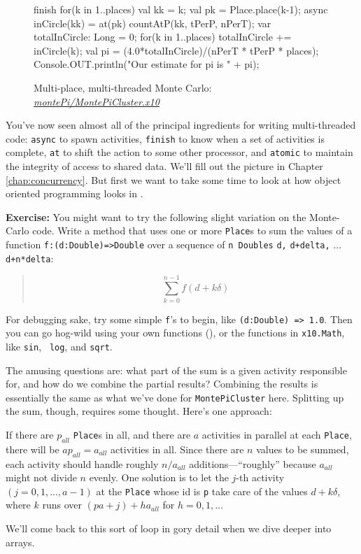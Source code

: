 \begin{figure}[!htbp]
\begin{xtennum}[]
{{      finish for(k in 1..places) {
         val kk = k;
         val pk = Place.place(k-1);
         async inCircle(kk) = at(pk) countAtP(kk, tPerP, nPerT);
      }
      var totalInCircle: Long = 0;
      for(k in 1..places) {
         totalInCircle += inCircle(k);
      }
      val pi = (4.0*totalInCircle)/(nPerT * tPerP * places);
      Console.OUT.println("Our estimate for pi is " + pi);
   }
}
\end{xtennum}
\hrulefill
\caption{Multi-place, multi-threaded Monte Carlo:
\href{http://dist.codehaus.org/x10/documentation/guide/src/montePi/MontePiCluster.x10}{\em
montePi/MontePiCluster.x10}}\label{fig:mpmtmc}
\end{figure}

You've now seen almost all of the principal ingredients for writing multi-threaded
\Xten{} code: {\tt async} to spawn activities, {\tt finish} to know when a
set of activities is complete, {\tt at} to shift the action to some other
processor, and {\tt atomic} to maintain the integrity of access to shared
data.  We'll fill out the picture in Chapter \ref{chap:concurrency}.
But first we want to take some time to look at how object oriented
programming looks in \Xten.

{\bf Exercise:} You might want to try the following slight variation on the Monte-Carlo
code.   Write a method that
uses one or more {\tt Place}s to sum the values of a function  {\tt f:(d:Double)=>Double} over a 
sequence of {\tt n Doubles}  {\tt d,} {\tt d+delta,} ... {\tt d+n*delta}:

\begin{quote}\begin{equation}
\sum_{k=0}^{n-1}  f(d + k\delta)
\end{equation}
\end{quote}

For debugging sake, try some simple {\tt f}'s to begin, like {\tt (d:Double) =>
1.0}.  Then you can go hog-wild using your own functions (), or the functions in {\tt x10.Math}, like {\tt sin}, {\tt
log}, and {\tt sqrt}.

The amusing questions are: what part of the sum is a given activity responsible for,
and how do we combine the partial results?  Combining the results is essentially
the same as what we've done for {\tt MontePiCluster} here.  Splitting up the
sum, though, requires some thought.  Here's one approach:

If there are $p_{all}$ {\tt Place}s in all, and there are $a$ activities
in parallel at each {\tt Place}, there will be $ap_{all} = a_{all}$
activities in all. Since there are
$n$ values to be summed, each activity should handle roughly $n/a_{all}$
additions---``roughly'' because $a_{all}$ might not divide $n$ evenly.
One solution is to let the $j$-th
activity $( j=0,1,...,a-1)$ at the {\tt Place} whose id is {\tt p}  take care of the values 
$d+k\delta$, where $k$ runs over $(p a+j)+h a_{all}$ for $h = 0,1,\dots$

We'll come back to this sort of loop in gory detail when we dive deeper into \Xten{} arrays.
